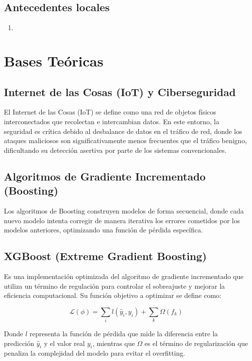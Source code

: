 \subsection{Antecedentes locales}
\begin{enumerate}
\item 
\end{enumerate}

\section{Bases Teóricas}

\subsection{Internet de las Cosas (IoT) y Ciberseguridad}
El Internet de las Cosas (IoT) se define como una red de objetos físicos interconectados que recolectan e intercambian datos. En este entorno, la seguridad es crítica debido al desbalance de datos en el tráfico de red, donde los ataques maliciosos son significativamente menos frecuentes que el tráfico benigno, dificultando su detección asertiva por parte de los sistemas convencionales.

\subsection{Algoritmos de Gradiente Incrementado (Boosting)}
Los algoritmos de Boosting construyen modelos de forma secuencial, donde cada nuevo modelo intenta corregir de manera iterativa los errores cometidos por los modelos anteriores, optimizando una función de pérdida específica.

\subsection{XGBoost (Extreme Gradient Boosting)}
Es una implementación optimizada del algoritmo de gradiente incrementado que utiliza un término de regulación para controlar el sobreajuste y mejorar la eficiencia computacional. Su función objetivo a optimizar se define como:

\begin{equation}
\mathcal{L}(\phi) = \sum_{i} l(\hat{y}_i, y_i) + \sum_{k} \Omega(f_k)
\end{equation}

Donde $l$ representa la función de pérdida que mide la diferencia entre la predicción $\hat{y}_i$ y el valor real $y_i$, mientras que $\Omega$ es el término de regularización que penaliza la complejidad del modelo para evitar el overfitting.


